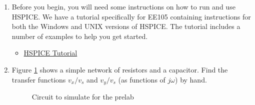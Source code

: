 \documentclass{article}
\begin{document}
\thispagestyle{plain}

\name

\begin{enumerate}
\item Before you begin, you will need some instructions on how to run and use HSPICE. We have a tutorial specifically for EE105 containing instructions for both the Windows and UNIX versions of HSPICE. The tutorial includes a number of examples to help you get started.
	
  \begin{itemize}
  \item \href{\baseurl/tutorials/HSPICE_Tutorial.pdf}{HSPICE Tutorial}
  \end{itemize}
  
\item Figure \ref{prelab} shows a simple network of resistors and a capacitor. Find the transfer functions $v_x/v_s$ and $v_y/v_s$ (as functions of $j\omega$) by hand.
  
  \begin{figure}[!htb]
    
    \centerline{\box\graph}
    \caption{Circuit to simulate for the prelab}
    \label{prelab}
  \end{figure}
  

\end{enumerate}
\end{document}
